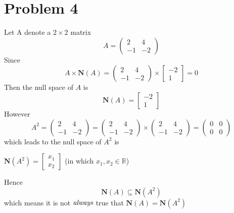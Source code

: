\documentclass[11pt]{article}
\begin{document}
\section*{Problem 4}
Let A denote a $2\times$2 matrix
$$ A =  
\begin{pmatrix}
2 & 4 \\ -1 & -2
\end{pmatrix}
$$
Since
$$A \times \textbf{N}(A) = \begin{pmatrix} 2 & 4 \\ -1 & -2 \end{pmatrix} \times \begin{bmatrix} -2 \\ 1 \end{bmatrix} = 0$$
Then the null space of $A$ is $$\textbf{N}(A) = \begin{bmatrix} -2 \\ 1 \end{bmatrix}$$
However
$$A^2 = \begin{pmatrix} 2 & 4 \\ -1 & -2 \end{pmatrix} = \begin{pmatrix} 2 & 4 \\ -1 & -2\end{pmatrix} \times \begin{pmatrix}2 & 4 \\ -1 & -2 \end{pmatrix} = \begin{pmatrix} 0 & 0 \\ 0 & 0\end{pmatrix}$$
which leads to the null space of $A^2$ is
\begin{center}
    $\textbf{N}(A^2) =  \begin{bmatrix} x_1 \\ x_2 \end{bmatrix}$ (in which $x_1, x_2 \in \mathbb{R}$)
\end{center}
Hence $$\textbf{N}(A) \subseteq \textbf{N}(A^2)$$which means it is not $\emph{always}$ true that $\textbf{N}(A) = \textbf{N}(A^2)$ 
\end{document}
